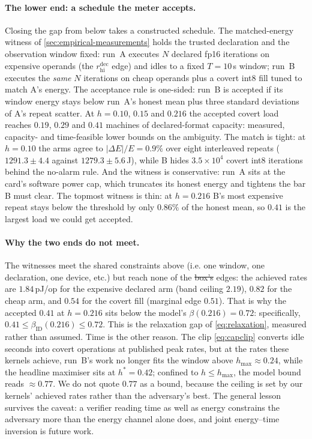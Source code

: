 \documentclass{article}
\makeatletter
\theoremstyle{plain}
\theoremstyle{definition}
\theoremstyle{remark}
\providecommand{\DIFaddtex}[1]{{\protect\color{blue}\uwave{#1}}} %
\providecommand{\DIFdeltex}[1]{{\protect\color{red}\sout{#1}}} %
\providecommand{\DIFaddbegin}{} %
\providecommand{\DIFaddend}{} %
\providecommand{\DIFdelbegin}{} %
\providecommand{\DIFdelend}{} %
\providecommand{\DIFadd}[1]{\texorpdfstring{\DIFaddtex{#1}}{#1}} %
\providecommand{\DIFdel}[1]{\texorpdfstring{\DIFdeltex{#1}}{}} %
\providecommand{\DIFscaledelfig}{0.5}
\newlength{\DIFdelgraphicswidth} %
\newlength{\DIFdelgraphicsheight} %
\providecommand{\DIFaddincludegraphics}[2][]{{\color{blue}\fbox{\DIFOincludegraphics[#1]{#2}}}} %
\providecommand{\DIFdelincludegraphics}[2][]{%
\sbox{\DIFdelgraphicsbox}{\DIFOincludegraphics[#1]{#2}}%
\settoboxwidth{\DIFdelgraphicswidth}{\DIFdelgraphicsbox} %
\settoboxtotalheight{\DIFdelgraphicsheight}{\DIFdelgraphicsbox} %
\scalebox{\DIFscaledelfig}{%
\parbox[b]{\DIFdelgraphicswidth}{\usebox{\DIFdelgraphicsbox}\\[-\baselineskip] \rule{\DIFdelgraphicswidth}{0em}}\llap{\resizebox{\DIFdelgraphicswidth}{\DIFdelgraphicsheight}{%
\setlength{\unitlength}{\DIFdelgraphicswidth}%
\begin{picture}(1,1)%
\thicklines\linethickness{2pt} %
{\color[rgb]{1,0,0}\put(0,0){\framebox(1,1){}}}%
{\color[rgb]{1,0,0}\put(0,0){\line( 1,1){1}}}%
{\color[rgb]{1,0,0}\put(0,1){\line(1,-1){1}}}%
\end{picture}%
}\hspace*{3pt}}} %
} %
\DeclareRobustCommand{\DIFaddbegin}{\DIFOaddbegin \let\includegraphics\DIFaddincludegraphics} %
\DeclareRobustCommand{\DIFaddend}{\DIFOaddend \let\includegraphics\DIFOincludegraphics} %
\DeclareRobustCommand{\DIFdelbegin}{\DIFOdelbegin \let\includegraphics\DIFdelincludegraphics} %
\DeclareRobustCommand{\DIFdelend}{\DIFOaddend \let\includegraphics\DIFOincludegraphics} %
\let\sout@orig\sout %
\renewcommand{\sout}[1]{\ifmmode\text{\sout@orig{\ensuremath{#1}}}\else\sout@orig{#1}\fi} %
\makeatother
\begin{document}
\paragraph{The lower end: a schedule the meter accepts.}
Closing the gap from below takes a constructed schedule. The matched-energy
witness of \cref{sec:empirical-measurements} holds the trusted
declaration and the observation window fixed: run~A executes $N$ declared
fp16 iterations on expensive operands (the $r_{\mathrm{hi}}^{\mathrm{dec}}$
edge) and idles to a fixed $T = 10$\,s window; run~B executes the
\emph{same} $N$ iterations on cheap operands plus a covert int8 fill
tuned to match A's energy. The acceptance rule is one-sided: run~B is
accepted if its window energy stays below run~A's honest mean plus three
standard deviations of A's repeat scatter. At $h = 0.10$, $0.15$ and
$0.216$ the accepted covert load reaches $0.19$, $0.29$ and $0.41$
machines of declared-format capacity: measured, capacity- and
time-feasible lower bounds on the ambiguity. The match is tight: at
$h = 0.10$ the arms agree to $|\Delta E|/E = 0.9\%$ over eight
interleaved repeats ($1291.3 \pm 4.4$ against $1279.3 \pm 5.6$\,J), while
B hides $3.5\times 10^{4}$ covert int8 iterations behind the no-alarm
rule. And the witness is conservative: run~A sits at the card's software
power cap, which truncates its honest energy and tightens the bar B must
clear. The topmost witness is thin: at $h = 0.216$ B's most expensive
repeat stays below the threshold by only $0.86\%$ of the honest mean, so
$0.41$ is the largest load we could get accepted.

\paragraph{Why the two ends do not meet.}
The witnesses meet the shared constraints above (i.e. one window, one
declaration, one device, etc.) but reach
none of the \DIFdelbegin \DIFdel{box's }\DIFdelend \DIFaddbegin \DIFadd{band }\DIFaddend edges: the achieved rates are $1.84$\,pJ/op for the
expensive declared arm (band ceiling $2.19$), $0.82$ for the cheap arm,
and $0.54$ for the covert fill (marginal edge $0.51$). That is why the
accepted $0.41$ at $h = 0.216$ sits below the model's
$\beta(0.216) = 0.72$: specifically,
$0.41 \leq \beta_{\mathrm{ID}}(0.216) \leq 0.72$. This is the relaxation
gap of \cref{eq:relaxation},
measured rather than assumed. Time is the other reason. The clip
\cref{eq:capclip} converts idle seconds into covert operations at
published peak rates, but at the rates these kernels achieve,
run~B's work no longer fits the window above $h_{\max} \approx 0.24$,
while the headline maximiser sits at $h^{*} = 0.42$; confined to
$h \le h_{\max}$, the model bound reads ${\approx}0.77$. We do not quote
$0.77$ as a bound, because the ceiling is set by our kernels' achieved
rates rather than the adversary's best. The general lesson survives the
caveat: a verifier reading time as well as energy constrains the
adversary more than the energy channel alone does, and joint energy--time
inversion is future work.
\end{document}
